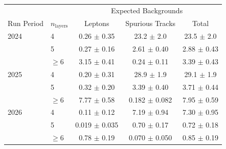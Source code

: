 \begin{tabular}{llccc}
\toprule
 & & \multicolumn{3}{c}{Expected Backgrounds} \\
Run Period & $n_{\mathrm{layers}}$ & Leptons & Spurious Tracks & Total \\
\midrule
2024 & 4 & 0.26 $\pm$ 0.35 & 23.2 $\pm$ 2.0 & 23.5 $\pm$ 2.0 \\
 & 5 & 0.27 $\pm$ 0.16 & 2.61 $\pm$ 0.40 & 2.88 $\pm$ 0.43 \\
 & $\geq 6$ & 3.15 $\pm$ 0.41 & 0.24 $\pm$ 0.11 & 3.39 $\pm$ 0.43 \\
\midrule
2025 & 4 & 0.20 $\pm$ 0.31 & 28.9 $\pm$ 1.9 & 29.1 $\pm$ 1.9 \\
 & 5 & 0.32 $\pm$ 0.20 & 3.39 $\pm$ 0.40 & 3.71 $\pm$ 0.44 \\
 & $\geq 6$ & 7.77 $\pm$ 0.58 & 0.182 $\pm$ 0.082 & 7.95 $\pm$ 0.59 \\
\midrule
2026 & 4 & 0.11 $\pm$ 0.12 & 7.19 $\pm$ 0.94 & 7.30 $\pm$ 0.95 \\
 & 5 & 0.019 $\pm$ 0.035 & 0.70 $\pm$ 0.17 & 0.72 $\pm$ 0.18 \\
 & $\geq 6$ & 0.78 $\pm$ 0.19 & 0.070 $\pm$ 0.050 & 0.85 $\pm$ 0.19 \\
\bottomrule
\end{tabular}
